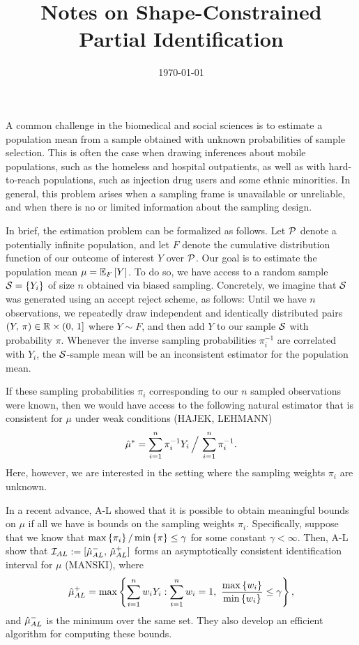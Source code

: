 \documentclass{article}
\author{}
\date{\today}
\title{Notes on Shape-Constrained Partial Identification}
\theoremstyle{plain}
\theoremstyle{definition}
\theoremstyle{remark}
\begin{document}
\maketitle

A common challenge in the biomedical and social sciences is to estimate a population mean
from a sample obtained with unknown probabilities of sample selection. This is often the case
when drawing inferences about mobile populations, such as the homeless and hospital outpatients,
as well as with hard-to-reach populations, such as injection drug users and some ethnic
minorities. In general, this problem arises when a sampling frame is unavailable or unreliable,
and when there is no or limited information about the sampling design.

In brief, the estimation problem can be formalized as follows. Let $\pp$ denote a potentially
infinite population, and let $F$ denote the cumulative distribution function of our outcome
of interest $Y$ over $\pp$. Our goal is to estimate the population mean $\mu = \EE[F]{Y}$.
To do so, we have access to a random sample $\set = \cb{Y_i}$ of size $n$ obtained via biased
sampling. Concretely, we imagine that $\set$ was generated using an accept reject scheme,
as follows: Until we have $n$ observations, we repeatedly draw independent and identically distributed
pairs $(Y, \, \pi) \in \RR \times (0, \, 1]$ where $Y \sim F$, and then add $Y$ to our sample $\set$ with
probability $\pi$. Whenever the inverse sampling probabilities $\pi_i^{-1}$ are correlated with $Y_i$,
the $\set$-sample mean will be an inconsistent estimator for the population mean.

If these sampling probabilities $\pi_i$ corresponding to our $n$ sampled observations were known,
then we would have access to the following natural estimator that is consistent for $\mu$
under weak conditions (HAJEK, LEHMANN)
\begin{equation}
\label{eq:hajek}
\hmu^* = \sum_{i = 1}^n \pi_i^{-1} Y_i \, \Big/ \, \sum_{i = 1}^n \pi_i^{-1}.
\end{equation}
Here, however, we are interested in the setting where the sampling weights $\pi_i$ are unknown.

In a recent advance, A-L showed that it is possible to obtain meaningful bounds on $\mu$ if all we
have is bounds on the sampling weights $\pi_i$. Specifically, suppose that we know that
$\max\cb{\pi_i} / \min\cb{\pi} \leq \gamma$ for some constant $\gamma < \infty$. Then,
A-L show that $\ii_{AL} := [\hmu_{AL}^-,\, \hmu_{AL}^+]$ forms an asymptotically consistent
identification interval for $\mu$ (MANSKI), where
\begin{equation}
\label{eq:AL}
\hmu_{AL}^+ = \max\cb{\sum_{i = 1}^n w_i Y_i : \sum_{i = 1}^n w_i = 1, \ \frac{\max\cb{w_i}}{\min\cb{w_i}} \leq \gamma},
\end{equation}
and $\hmu_{AL}^-$ is the minimum over the same set. They also develop an efficient algorithm for
computing these bounds.
\end{document}
